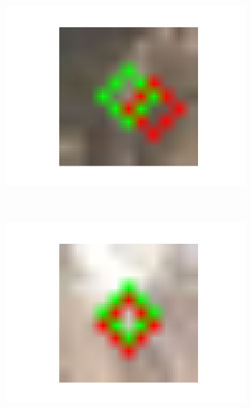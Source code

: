\documentclass[11pt,a4paper]{article}
\begin{document}
\begin{figure}[H]
	\begin{subfigure}[t]{.5\textwidth}
		\centering
		\includegraphics[scale=0.3]{img/kp-small1}
	\end{subfigure}%
	~ \quad
	\begin{subfigure}[t]{.5\textwidth}
		\centering
		\includegraphics[scale=0.3]{img/kp-small2}
	\end{subfigure}
	

\end{figure}
\end{document}
